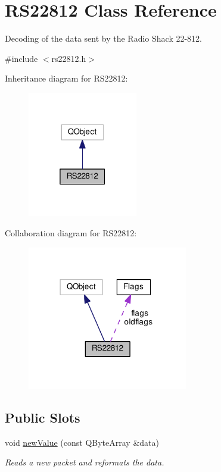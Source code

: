 \hypertarget{class_r_s22812}{\section{R\-S22812 Class Reference}
\label{class_r_s22812}
}


Decoding of the data sent by the Radio Shack 22-\/812.  




{\ttfamily \#include $<$rs22812.\-h$>$}



Inheritance diagram for R\-S22812\-:\nopagebreak
\begin{figure}[H]
\begin{center}
\leavevmode
\includegraphics[width=136pt]{class_r_s22812__inherit__graph}
\end{center}
\end{figure}


Collaboration diagram for R\-S22812\-:\nopagebreak
\begin{figure}[H]
\begin{center}
\leavevmode
\includegraphics[width=198pt]{class_r_s22812__coll__graph}
\end{center}
\end{figure}
\subsection*{Public Slots}
\begin{DoxyCompactItemize}
\item 
void \hyperlink{class_r_s22812_a5de59c9521bc80e37745c8c3243d9229}{new\-Value} (const Q\-Byte\-Array \&data)
\begin{DoxyCompactList}\small\item\em Reads a new packet and reformats the data. \end{DoxyCompactList}\end{DoxyCompactItemize}
